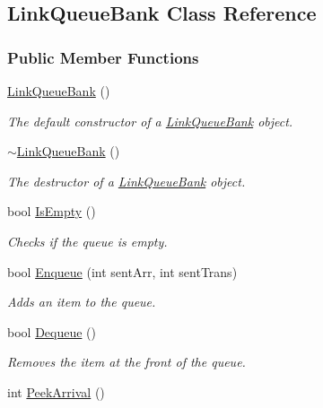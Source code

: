 \hypertarget{class_link_queue_bank}{}\subsection{Link\+Queue\+Bank Class Reference}
\label{class_link_queue_bank}
\subsubsection*{Public Member Functions}
\begin{DoxyCompactItemize}
\item 
\hyperlink{class_link_queue_bank_ab78ce225e07df7fd11b5589afa74c80b}{Link\+Queue\+Bank} ()
\begin{DoxyCompactList}\small\item\em The default constructor of a \hyperlink{class_link_queue_bank}{Link\+Queue\+Bank} object. \end{DoxyCompactList}\item 
\hyperlink{class_link_queue_bank_a0374f8d3dced5a8d0bfb3b36b2bd0188}{$\sim$\+Link\+Queue\+Bank} ()
\begin{DoxyCompactList}\small\item\em The destructor of a \hyperlink{class_link_queue_bank}{Link\+Queue\+Bank} object. \end{DoxyCompactList}\item 
bool \hyperlink{class_link_queue_bank_ae994d7f8bbc21f291727e10d65cb4f86}{Is\+Empty} ()
\begin{DoxyCompactList}\small\item\em Checks if the queue is empty. \end{DoxyCompactList}\item 
bool \hyperlink{class_link_queue_bank_a6df8699093b303c708ff4cca4b57c4b4}{Enqueue} (int sent\+Arr, int sent\+Trans)
\begin{DoxyCompactList}\small\item\em Adds an item to the queue. \end{DoxyCompactList}\item 
bool \hyperlink{class_link_queue_bank_a2b883c55e0524816b9871a2b4059e498}{Dequeue} ()
\begin{DoxyCompactList}\small\item\em Removes the item at the front of the queue. \end{DoxyCompactList}\item 
int \hyperlink{class_link_queue_bank_aa22f4ad15b0a2fb8df62af483e79cd80}{Peek\+Arrival} ()

\end{DoxyCompactItemize}
